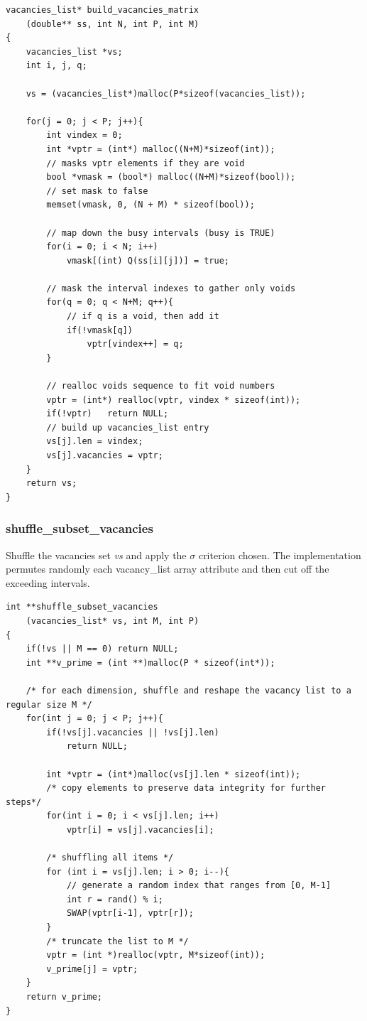 \documentclass[12pt]{extarticle}
\begin{document}
\begin{lstlisting}[style=CStyle]
vacancies_list* build_vacancies_matrix
	(double** ss, int N, int P, int M)
{
    vacancies_list *vs;
    int i, j, q;

    vs = (vacancies_list*)malloc(P*sizeof(vacancies_list));

    for(j = 0; j < P; j++){
        int vindex = 0;
        int *vptr = (int*) malloc((N+M)*sizeof(int));
        // masks vptr elements if they are void 
        bool *vmask = (bool*) malloc((N+M)*sizeof(bool));   
        // set mask to false 
        memset(vmask, 0, (N + M) * sizeof(bool));           
        
        // map down the busy intervals (busy is TRUE)
        for(i = 0; i < N; i++)
            vmask[(int) Q(ss[i][j])] = true;
        
        // mask the interval indexes to gather only voids
        for(q = 0; q < N+M; q++){
            // if q is a void, then add it
            if(!vmask[q])   
                vptr[vindex++] = q;
        }

        // realloc voids sequence to fit void numbers
        vptr = (int*) realloc(vptr, vindex * sizeof(int));
        if(!vptr)   return NULL;
        // build up vacancies_list entry
        vs[j].len = vindex;
        vs[j].vacancies = vptr;
    }
    return vs;
}
\end{lstlisting}


\subsubsection{shuffle{\_}subset{\_}vacancies}
Shuffle the vacancies set \emph{vs} and apply the $\sigma$ criterion chosen. The implementation permutes randomly each vacancy{\_}list array attribute and then cut off the exceeding intervals. 

\begin{lstlisting}[style=CStyle]
int **shuffle_subset_vacancies
	(vacancies_list* vs, int M, int P)
{
    if(!vs || M == 0) return NULL;
    int **v_prime = (int **)malloc(P * sizeof(int*));

    /* for each dimension, shuffle and reshape the vacancy list to a regular size M */
    for(int j = 0; j < P; j++){
        if(!vs[j].vacancies || !vs[j].len)
            return NULL;

        int *vptr = (int*)malloc(vs[j].len * sizeof(int));
        /* copy elements to preserve data integrity for further steps*/
        for(int i = 0; i < vs[j].len; i++)
            vptr[i] = vs[j].vacancies[i];

        /* shuffling all items */
        for (int i = vs[j].len; i > 0; i--){ 
            // generate a random index that ranges from [0, M-1]
            int r = rand() % i;     
            SWAP(vptr[i-1], vptr[r]);
        }
        /* truncate the list to M */
        vptr = (int *)realloc(vptr, M*sizeof(int)); 
        v_prime[j] = vptr;
    }
    return v_prime;
}
\end{lstlisting}
\end{document}
